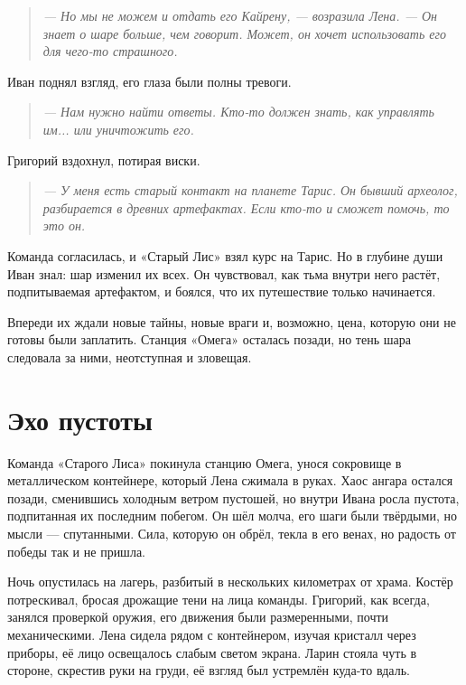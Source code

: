 \documentclass[12pt,a4paper]{book}
\newenvironment{dialogue}{\begin{quote}\itshape}{\end{quote}}
\begin{document}
\begin{dialogue}
--- Но мы не можем и отдать его Кайрену, --- возразила Лена. --- Он знает о шаре больше, чем говорит. Может, он хочет использовать его для чего-то страшного.
\end{dialogue}

Иван поднял взгляд, его глаза были полны тревоги.

\begin{dialogue}
--- Нам нужно найти ответы. Кто-то должен знать, как управлять им... или уничтожить его.
\end{dialogue}

Григорий вздохнул, потирая виски.

\begin{dialogue}
--- У меня есть старый контакт на планете Тарис. Он бывший археолог, разбирается в древних артефактах. Если кто-то и сможет помочь, то это он.
\end{dialogue}

Команда согласилась, и «Старый Лис» взял курс на Тарис. Но в глубине души Иван знал: шар изменил их всех. Он чувствовал, как тьма внутри него растёт, подпитываемая артефактом, и боялся, что их путешествие только начинается.

Впереди их ждали новые тайны, новые враги и, возможно, цена, которую они не готовы были заплатить. Станция «Омега» осталась позади, но тень шара следовала за ними, неотступная и зловещая.

\chapter{Эхо пустоты}

Команда «Старого Лиса» покинула станцию Омега, унося сокровище в металлическом контейнере, который Лена сжимала в руках. Хаос ангара остался позади, сменившись холодным ветром пустошей, но внутри Ивана росла пустота, подпитанная их последним побегом. Он шёл молча, его шаги были твёрдыми, но мысли --- спутанными. Сила, которую он обрёл, текла в его венах, но радость от победы так и не пришла.

Ночь опустилась на лагерь, разбитый в нескольких километрах от храма. Костёр потрескивал, бросая дрожащие тени на лица команды. Григорий, как всегда, занялся проверкой оружия, его движения были размеренными, почти механическими. Лена сидела рядом с контейнером, изучая кристалл через приборы, её лицо освещалось слабым светом экрана. Ларин стояла чуть в стороне, скрестив руки на груди, её взгляд был устремлён куда-то вдаль.
\end{document}

